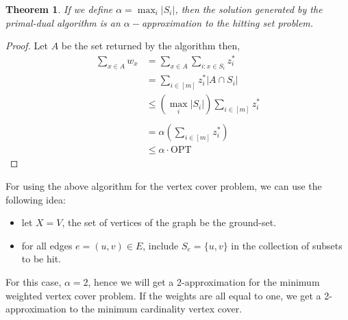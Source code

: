 \documentclass{article}
\numberwithin{equation}{section}
\newtheorem{theorem}{Theorem}
\numberwithin{theorem}{section}
\numberwithin{lemma}{section}
\newcommand{\roundBrace}[1]{\left(#1\right)}
\newcommand{\card}[1]{\left|#1\right|}
\begin{document}
\begin{theorem}
    If we define $\alpha = \max_i \card{S_i}$, then the solution generated by the primal-dual algorithm is an $\alpha-$approximation to the hitting set problem. 
\end{theorem}
\begin{proof}
    Let $A$ be the set returned by the algorithm then, 
    \begin{equation}
        \begin{split}
            \sum_{x\in A} w_x &= \sum_{x\in A} \sum_{i:x\in S_i} z^*_i\\
            &= \sum_{i\in[m]} z^*_i \card{A\cap S_i}\\
            &\le \roundBrace{\max_i \card{S_i}} \sum_{i\in[m]} z^*_i\\\\
            &= \alpha \roundBrace{\sum_{i\in[m]} z^*_i} \\
            &\le \alpha \cdot \text{OPT}
        \end{split}
    \end{equation}
\end{proof}
For using the above algorithm for the vertex cover problem, we can use the following idea: 
\begin{itemize}
    \item let $X = V$, the set of vertices of the graph be the ground-set. 
    \item for all edges $e = (u, v) \in E$, include $S_e = \{u, v\}$ in the collection of subsets to be hit. 
\end{itemize}
For this case, $\alpha = 2$, hence we will get a 2-approximation for the minimum weighted vertex cover problem. If the weights are all equal to one, we get a 2-approximation to the minimum cardinality vertex cover. 
\newpage
\end{document}
